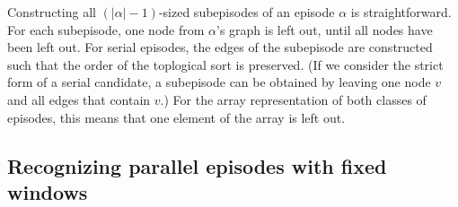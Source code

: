 Constructing all $ (| \alpha | - 1) $-sized subepisodes of an episode $ \alpha $ is straightforward. For each subepisode, one node from $ \alpha $'s graph is left out, until all nodes have been left out. For serial episodes, the edges of the subepisode are constructed such that the order of the toplogical sort is preserved. (If we consider the strict form of a serial candidate, a subepisode can be obtained by leaving one node $ v $ and all edges that contain $ v $.) For the array representation of both classes of episodes, this means that one element of the array is left out.


\subsection{Recognizing parallel episodes with fixed windows}

